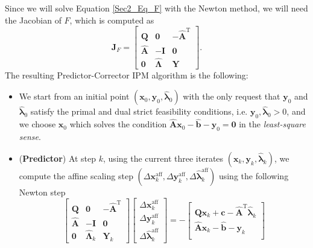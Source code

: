 \\
\\
\noindent Since we will solve Equation \eqref{Sec2_Eq_F} with the Newton method, we will need the Jacobian of \(F\), which is computed as
    \[ \mathbf{J}_F = \begin{bmatrix}
        \mathbf{Q} & \mathbf{0} & -\hat{\mathbf{A}}^\mathrm{T}\\
        \hat{\mathbf{A}} & -\mathbf{I} & \mathbf{0} \\
        \mathbf{0} & \hat{\mathbf{\Lambda}} &\mathbf{Y}
        \end{bmatrix}.\]
    The resulting Predictor-Corrector IPM algorithm is the following:
    \begin{itemize}
        \item We start from an initial point $(\bm{x}_0,\bm{y}_{0}, \hat{\bm{\lambda}}_{0})$ with the only request that $\bm{y}_0$ and $\hat{\bm{\lambda}}_0$ satisfy the primal and dual strict feasibility conditions, i.e. $\bm{y}_0, \hat{\bm{\lambda}}_0 > 0$, and we choose $\bm{x}_{0}$ which solves the condition $\hat{\mathbf{A}}\bm{x}_{0} - \hat{\bm{b}} -\bm{y}_{0} = \bm{0}$ in the \textit{least-square sense}.
        \item (\textbf{Predictor}) At step $k$, using the current three iterates $(\bm{x}_k, \bm{y}_k, \hat{\bm{\lambda}}_k)$, we compute the affine scaling step $(\Delta\bm{x}_k^\mathrm{aff}, \Delta{\bm{y}}_k^\mathrm{aff},  \Delta\hat{\bm{\lambda}}_k^\mathrm{aff})$ using the following Newton step
        \begin{equation} \label{Sec_2_Eq_NewtonStep1}
        \begin{bmatrix}
            \mathbf{Q} & \mathbf{0} & -\hat{\mathbf{A}}^\mathrm{T}\\
            \hat{\mathbf{A}} & -\mathbf{I} & \mathbf{0} \\
            \mathbf{0} & \hat{\mathbf{\Lambda}}_k &\mathbf{Y}_k
            \end{bmatrix} 
        \begin{bmatrix}
            \Delta\bm{x}_k^\mathrm{aff} \\  \Delta\bm{y}_k^\mathrm{aff} \\
            \Delta\hat{\bm{\lambda}}_k^\mathrm{aff}
        \end{bmatrix} =
        -\begin{bmatrix}
            \mathbf{Q}\bm{x}_k + \bm{c} - \hat{\mathbf{A}}^\mathrm{T}\hat{\bm{\lambda}}_k\\
            \hat{\mathbf{A}}\bm{x}_k - \hat{\bm{b}} - \bm{y}_k\\

\end{bmatrix}
\end{equation}
\end{itemize}
